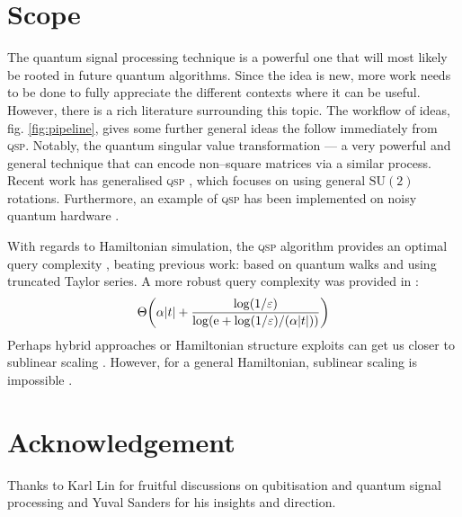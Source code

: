 \documentclass{article}
\begin{document}
\section{Scope}
The quantum signal processing technique is a powerful one that will most likely be rooted in future quantum algorithms. Since the idea is new, more work needs to be done to fully appreciate the different contexts where it can be useful. However, there is a rich literature surrounding this topic. The workflow of ideas, fig. \ref{fig:pipeline}, gives some further general ideas the follow immediately from \textsc{qsp}. Notably, the quantum singular value transformation \cite{GSLW19} --- a very powerful and general technique that can encode non--square matrices via a similar process. Recent work has generalised \textsc{qsp} \cite{MW23}, which focuses on using general $\text{SU}(2)$ rotations. Furthermore, an example of \textsc{qsp} has been implemented on noisy quantum hardware \cite{KKCLB23}. 

With regards to Hamiltonian simulation, the \textsc{qsp} algorithm provides an optimal query complexity \cite{LC17}, beating previous work: \cite{BCK15} based on quantum walks and \cite{BCCKS15} using truncated Taylor series. A more robust query complexity was provided in \cite{GSLW19}:
\begin{equation}
    \Theta\bigg(\alpha \abs{t} + \frac{\log(1/\varepsilon)}{\log(\mathrm{e} + \log(1/\varepsilon)/(\alpha\abs{t}))} \bigg)
\end{equation}
Perhaps hybrid approaches or Hamiltonian structure exploits can get us closer to sublinear scaling \cite{CHICCS20}. However, for a general Hamiltonian, sublinear scaling is impossible \cite{BACS06}.

\section*{Acknowledgement}\label{sec:ack}
Thanks to Karl Lin for fruitful discussions on qubitisation and quantum signal processing and Yuval Sanders for his insights and direction.

\newpage


\end{document}

